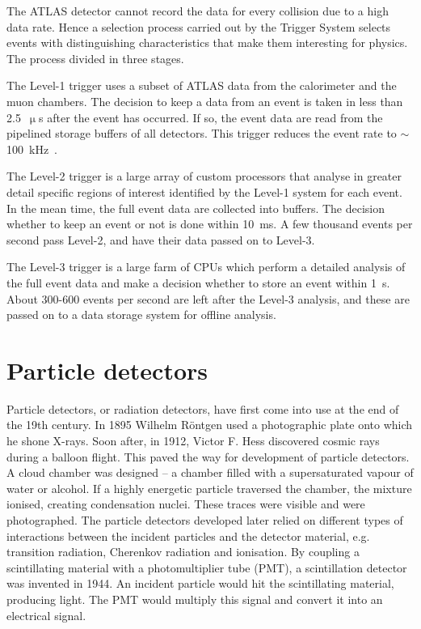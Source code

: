 The ATLAS detector cannot record the data for every collision due to a high data rate. Hence a selection process carried out by the Trigger System selects events with distinguishing characteristics that make them interesting for physics. The process divided in three stages. 

The Level-1 trigger uses a subset of ATLAS data from the calorimeter and the muon chambers. The decision to keep a data from an event is taken in less than 2.5~$\upmu$s after the event has occurred. If so, the event data are read from the pipelined storage buffers of all detectors. This trigger reduces the event rate to $\sim$100~kHz~\cite{Jenni:1193085}. 

The Level-2 trigger is a large array of custom processors that analyse in greater detail specific regions of interest identified by the Level-1 system for each event. In the mean time, the full event data are collected into buffers. The decision whether to keep an event or not is done within 10~ms. A few thousand events per second pass Level-2, and have their data passed on to Level-3.

The Level-3 trigger is a large farm of CPUs which perform a detailed analysis of the full event data and make a decision whether to store an event within 1~s. About 300-600 events per second are left after the Level-3 analysis, and these are passed on to a data storage system for offline analysis. 



\section{Particle detectors}
Particle detectors, or radiation detectors, have first come into use at the end of the 19th century. In 1895 Wilhelm R\"ontgen used a photographic plate onto which he shone X-rays. Soon after, in 1912, Victor F. Hess discovered cosmic rays during a balloon flight. This paved the way for development of particle detectors. A cloud chamber was designed -- a chamber filled with a supersaturated vapour of water or alcohol. If a highly energetic particle traversed the chamber, the mixture ionised, creating condensation nuclei. These traces were visible and were photographed. The particle detectors developed later relied on different types of interactions between the incident particles and the detector material, e.g. transition radiation, Cherenkov radiation and ionisation. By coupling a scintillating material with a photomultiplier tube (PMT), a scintillation detector was invented in 1944. An incident particle would hit the scintillating material, producing light. The PMT would multiply this signal and convert it into an electrical signal.

